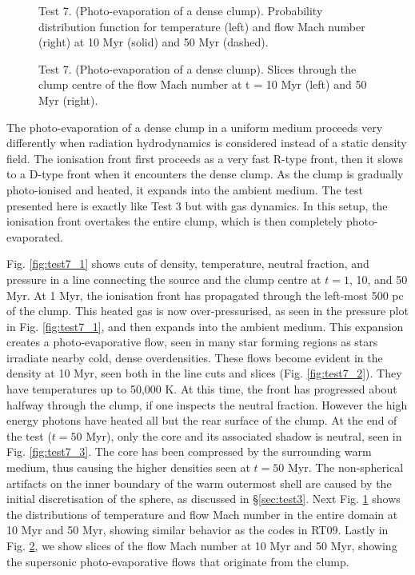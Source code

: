 \documentclass[useAMS,usenatbib]{mn2e}
\begin{document}
\begin{figure}
  \caption{\label{fig:test7_pdf} Test 7. (Photo-evaporation of a dense
    clump).  Probability distribution function for temperature (left)
    and flow Mach number (right) at 10 Myr (solid) and 50 Myr
    (dashed).}
\end{figure}

\begin{figure}
  \caption{\label{fig:test7_4} Test 7. (Photo-evaporation of a dense
    clump).  Slices through the clump centre of the flow Mach number
    at t = 10 Myr (left) and 50 Myr (right).}
\end{figure}

The photo-evaporation of a dense clump in a uniform medium proceeds
very differently when radiation hydrodynamics is considered instead of
a static density field.  The ionisation front first proceeds as a very
fast R-type front, then it slows to a D-type front when it encounters
the dense clump.  As the clump is gradually photo-ionised and heated,
it expands into the ambient medium.  The test presented here is
exactly like Test 3 but with gas dynamics.  In this setup, the
ionisation front overtakes the entire clump, which is then completely
photo-evaporated.

Fig. \ref{fig:test7_1} shows cuts of density, temperature, neutral
fraction, and pressure in a line connecting the source and the clump
centre at $t = 1$, 10, and 50 Myr.  At 1 Myr, the ionisation front has
propagated through the left-most 500 pc of the clump.  This heated gas
is now over-pressurised, as seen in the pressure plot in Fig.
\ref{fig:test7_1}, and then expands into the ambient medium.  This
expansion creates a photo-evaporative flow, seen in many star forming
regions \citep[e.g. M16;][]{Hester96} as stars irradiate nearby cold,
dense overdensities.  These flows become evident in the density at 10
Myr, seen both in the line cuts and slices (Fig. \ref{fig:test7_2}).
They have temperatures up to 50,000 K.  At this time, the front has
progressed about halfway through the clump, if one inspects the
neutral fraction.  However the high energy photons have heated all but
the rear surface of the clump.  At the end of the test ($t = 50$ Myr),
only the core and its associated shadow is neutral, seen in Fig.
\ref{fig:test7_3}.  The core has been compressed by the surrounding
warm medium, thus causing the higher densities seen at $t = 50$ Myr.
The non-spherical artifacts on the inner boundary of the warm
outermost shell are caused by the initial discretisation of the
sphere, as discussed in \S\ref{sec:test3}.  Next
Fig. \ref{fig:test7_pdf} shows the distributions of temperature and
flow Mach number in the entire domain at 10 Myr and 50 Myr, showing
similar behavior as the codes in RT09.  Lastly in
Fig. \ref{fig:test7_4}, we show slices of the flow Mach number at 10
Myr and 50 Myr, showing the supersonic photo-evaporative flows that
originate from the clump.
\end{document}
